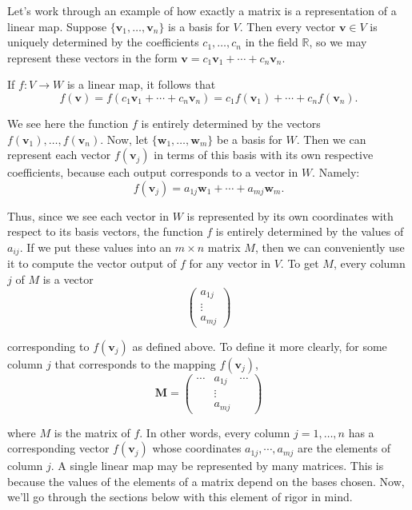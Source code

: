 \documentclass{article}
\begin{document}
Let's work through an example of how exactly a matrix is a representation of a linear map. Suppose $\{\mathbf{v}_1, \ldots, \mathbf{v}_n\}$ is a basis for $V$. Then every vector $\mathbf{v} \in V$ is uniquely determined by the coefficients $c_1, \ldots, c_n$ in the field $\mathbb{R}$, so we may represent these vectors in the form $\mathbf{v} = c_1\mathbf{v}_1 + \cdots + c_n\mathbf{v}_n.$
 
If $f: V \to W$ is a linear map, it follows that
$$f(\mathbf{v}) = f(c_1\mathbf{v}_1 + \cdots + c_n\mathbf{v}_n) = c_1 f(\mathbf{v}_1) + \cdots + c_n f(\mathbf{v}_n).$$
 
We see here the function $f$ is entirely determined by the vectors $f(\mathbf{v}_1), \ldots, f(\mathbf{v}_n)$. Now, let $\{\mathbf{w}_1, \ldots, \mathbf{w}_m\}$ be a basis for $W$. Then we can represent each vector $f(\mathbf{v}_j)$ in terms of this basis with its own respective coefficients, because each output corresponds to a vector in $W$. Namely:
$$f(\mathbf{v}_j) = a_{1j}\mathbf{w}_1 + \cdots + a_{mj}\mathbf{w}_m.$$
 
Thus, since we see each vector in $W$ is represented by its own coordinates with respect to its basis vectors, the function $f$ is entirely determined by the values of $a_{ij}$. If we put these values into an $m \times n$ matrix $M$, then we can conveniently use it to compute the vector output of $f$ for any vector in $V$. To get $M$, every column $j$ of $M$ is a vector
$$\begin{pmatrix} a_{1j} \\ \vdots \\ a_{mj} \end{pmatrix}$$
 
\noindent corresponding to $f(\mathbf{v}_j)$ as defined above. To define it more clearly, for some column $j$ that corresponds to the mapping $f(\mathbf{v}_j)$,
$$\mathbf{M} = \begin{pmatrix} \cdots & a_{1j} & \cdots \\ & \vdots & \\ & a_{mj} & \end{pmatrix}$$
 
\noindent where $M$ is the matrix of $f$. In other words, every column $j = 1, \ldots, n$ has a corresponding vector $f(\mathbf{v}_j)$ whose coordinates $a_{1j}, \cdots, a_{mj}$ are the elements of column $j$. A single linear map may be represented by many matrices. This is because the values of the elements of a matrix depend on the bases chosen. Now, we'll go through the sections below with this element of rigor in mind.
 
\end{document}
